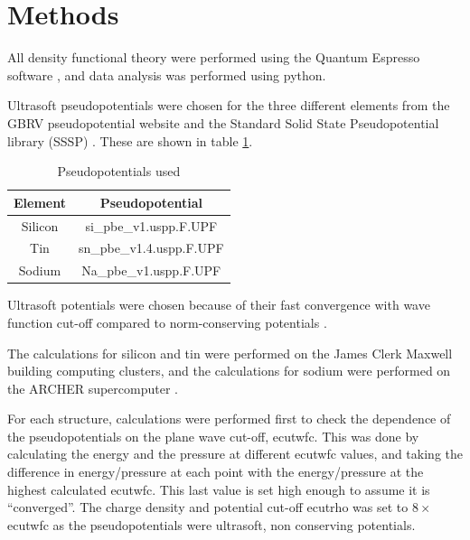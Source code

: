 \documentclass[12pt]{article}
\begin{document}
\section{Methods}
All density functional theory were performed using the Quantum Espresso software \cite{0953-8984-21-39-395502}, and data analysis was performed using python.

Ultrasoft pseudopotentials were chosen for the three different elements from the GBRV pseudopotential website \cite{rutgers} and the Standard Solid State Pseudopotential library (SSSP) \cite{SSSPwebsite}. 
These are shown in table \ref{tab:pseudopotentials}.
\begin{table}
\centering
	\begin{tabular}{|c|c|}
\hline
Element & Pseudopotential \\
\hline
Silicon & si\_pbe\_v1.uspp.F.UPF \cite{rutgers} \\
Tin & sn\_pbe\_v1.4.uspp.F.UPF \cite{rutgers} \\
Sodium & Na\_pbe\_v1.uspp.F.UPF \cite{SSSPwebsite} \\
\hline
\end{tabular}
\caption{Pseudopotentials used}
\label{tab:pseudopotentials}
\end{table}

Ultrasoft potentials were chosen because of their fast convergence with wave function cut-off compared to norm-conserving potentials \cite{vanderbilt1990soft}. 

The calculations for silicon and tin were performed on the James Clerk Maxwell building computing clusters, and the calculations for sodium were performed on the ARCHER supercomputer \cite{archer}.

For each structure, calculations were performed first to check the dependence of the pseudopotentials on the plane wave cut-off, ecutwfc. This was done by calculating the energy and the pressure at different ecutwfc values, and taking the difference in energy/pressure at each point with the energy/pressure at the highest calculated ecutwfc. This last value is set high enough to assume it is ``converged''. 
The charge density and potential cut-off ecutrho was set to $8\times$ ecutwfc as the pseudopotentials were ultrasoft, non conserving potentials.
\end{document}

